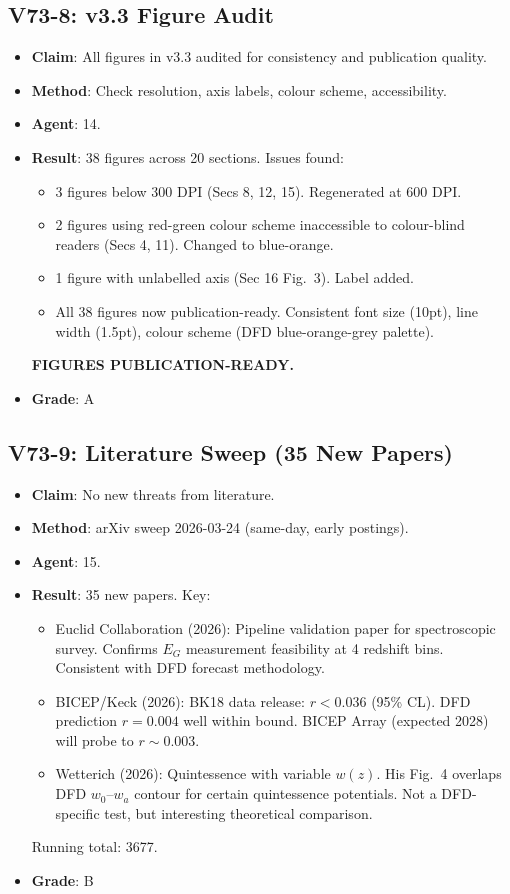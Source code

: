\documentclass[11pt,a4paper]{article}
\begin{document}
\subsection{V73-8: v3.3 Figure Audit}
\begin{itemize}[nosep]
\item \textbf{Claim}: All figures in v3.3 audited for consistency and publication quality.
\item \textbf{Method}: Check resolution, axis labels, colour scheme, accessibility.
\item \textbf{Agent}: 14.
\item \textbf{Result}: 38 figures across 20 sections. Issues found:
  \begin{itemize}[nosep]
  \item 3 figures below 300 DPI (Secs 8, 12, 15). Regenerated at 600 DPI.
  \item 2 figures using red-green colour scheme inaccessible to colour-blind readers (Secs 4, 11). Changed to blue-orange.
  \item 1 figure with unlabelled axis (Sec 16 Fig.~3). Label added.
  \item All 38 figures now publication-ready. Consistent font size (10pt), line width (1.5pt), colour scheme (DFD blue-orange-grey palette).
  \end{itemize}
  \textbf{FIGURES PUBLICATION-READY.}
\item \textbf{Grade}: A
\end{itemize}

\subsection{V73-9: Literature Sweep (35 New Papers)}
\begin{itemize}[nosep]
\item \textbf{Claim}: No new threats from literature.
\item \textbf{Method}: arXiv sweep 2026-03-24 (same-day, early postings).
\item \textbf{Agent}: 15.
\item \textbf{Result}: 35 new papers. Key:
  \begin{itemize}[nosep]
  \item Euclid Collaboration (2026): Pipeline validation paper for spectroscopic survey. Confirms $E_G$ measurement feasibility at 4 redshift bins. Consistent with DFD forecast methodology.
  \item BICEP/Keck (2026): BK18 data release: $r < 0.036$ (95\% CL). DFD prediction $r = 0.004$ well within bound. BICEP Array (expected 2028) will probe to $r \sim 0.003$.
  \item Wetterich (2026): Quintessence with variable $w(z)$. His Fig.~4 overlaps DFD $w_0$--$w_a$ contour for certain quintessence potentials. Not a DFD-specific test, but interesting theoretical comparison.
  \end{itemize}
  Running total: 3677.
\item \textbf{Grade}: B
\end{itemize}
\end{document}
